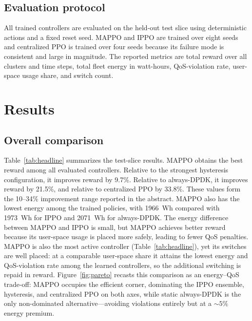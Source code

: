 \documentclass[10pt,conference,letterpaper]{IEEEtran}
\begin{document}
\subsection{Evaluation protocol}
All trained controllers are evaluated on the held-out test slice using
deterministic actions and a fixed reset seed. MAPPO and IPPO are trained over
eight seeds and centralized PPO is trained over four
seeds because its failure mode is consistent and large in magnitude. The
reported metrics are total reward over all clusters and time steps, total fleet
energy in watt-hours, QoS-violation rate, user-space usage share, and switch
count.
\section{Results}
\label{sec:results}
\subsection{Overall comparison}
Table~\ref{tab:headline} summarizes the test-slice results. MAPPO obtains the
best reward among all evaluated controllers. Relative to the strongest
hysteresis configuration, it improves reward by 9.7\%. Relative to always-DPDK,
it improves reward by 21.5\%, and relative to centralized PPO by 33.8\%. These
values form the 10--34\% improvement range reported in the abstract. MAPPO also
has the lowest energy among the trained policies, with 1966~Wh compared with
1973~Wh for IPPO and 2071~Wh for always-DPDK. The energy difference between
MAPPO and IPPO is small, but MAPPO achieves better reward because its user-space
usage is placed more safely, leading to fewer QoS penalties. MAPPO is also the
most active controller (Table~\ref{tab:headline}), yet its switches are well
placed: at a comparable user-space share it attains the lowest energy and
QoS-violation rate among the learned controllers, so the additional switching is
repaid in reward. Figure~\ref{fig:pareto} recasts this comparison as an
energy--QoS trade-off: MAPPO occupies the efficient corner, dominating the IPPO
ensemble, hysteresis, and centralized PPO on both axes, while static always-DPDK
is the only non-dominated alternative---avoiding violations entirely but at a
${\sim}5\%$ energy premium.
\end{document}
